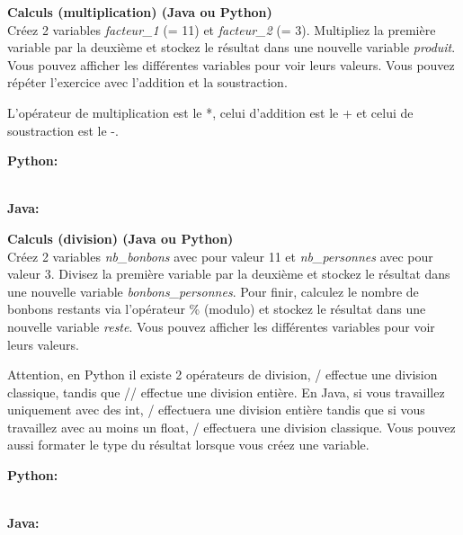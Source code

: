 \begin{Exercice}[3 minutes] \textbf{Calculs (multiplication) (Java ou Python)}\\

   Créez 2 variables \textit{facteur\_1} (= 11) et \textit{facteur\_2} (= 3). Multipliez la première variable par la deuxième et stockez le résultat dans une nouvelle variable \textit{produit}. Vous pouvez afficher les différentes variables pour voir leurs valeurs. Vous pouvez répéter l'exercice avec l'addition et la soustraction. \\
   
    \begin{conseil}
      	L'opérateur de multiplication est le *, celui d'addition est le + et celui de soustraction est le -.
        
    \end{conseil}
    \begin{solution}
    
    \textbf{Python:}
    
    
    \textbf{\\Java:}
    
           
    \end{solution}   
\end{Exercice}

\begin{Exercice}[10 minutes] \textbf{Calculs (division) \optionnel (Java ou Python)}\\
   Créez 2 variables \textit{nb\_bonbons} avec pour valeur 11 et \textit{nb\_personnes} avec pour valeur 3. Divisez la première variable par la deuxième et stockez le résultat dans une nouvelle variable \textit{bonbons\_personnes}. Pour finir, calculez le nombre de bonbons restants via l'opérateur \% (modulo) et stockez le résultat dans une nouvelle variable \textit{reste}. Vous pouvez afficher les différentes variables pour voir leurs valeurs. \\
   
    \begin{conseil}
      	Attention, en Python il existe 2 opérateurs de division, / effectue une division classique, tandis que // effectue une division entière. En Java, si vous travaillez uniquement avec des int, / effectuera une division entière tandis que si vous travaillez avec au moins un float, / effectuera une division classique. Vous pouvez aussi formater le type du résultat lorsque vous créez une variable.
        
    \end{conseil}
    \begin{solution}
    
    \textbf{Python:}
    
    
    
    \textbf{\\Java:}
    
           
    \end{solution}   
\end{Exercice}

